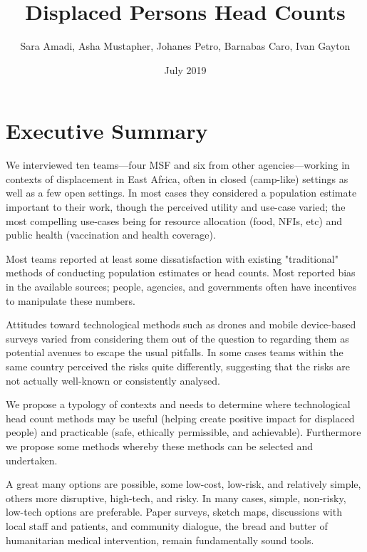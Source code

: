 \documentclass[a4paper,12pt,twoside]{article}
\title{Displaced Persons Head Counts}
\author{Sara Amadi, Asha Mustapher, Johanes Petro, Barnabas Caro, Ivan Gayton }
\date{July 2019}
\begin{document}
\maketitle


\renewcommand{\baselinestretch}{1.5}\normalsize %
\tableofcontents
\renewcommand{\baselinestretch}{1.0}\normalsize

\newpage

\section{Executive Summary}
\begin{multicols}{2}
We interviewed ten teams---four MSF and six from other agencies---working in contexts of displacement in East Africa, often in closed (camp-like) settings as well as a few open settings. In most cases they considered a population estimate important to their work, though the perceived utility and use-case varied; the most compelling use-cases being for resource allocation (food, NFIs, etc) and public health (vaccination and health coverage). 

Most teams reported at least some dissatisfaction with existing "traditional" methods of conducting population estimates or head counts. Most reported bias in the available sources; people, agencies, and governments often have incentives to manipulate these numbers. 

Attitudes toward technological methods such as drones and mobile device-based surveys varied from considering them out of the question to regarding them as potential avenues to escape the usual pitfalls. In some cases teams within the same country perceived the risks quite differently, suggesting that the risks are not actually well-known or consistently analysed. 

We propose a typology of contexts and needs to determine where technological head count methods may be useful (helping create positive impact for displaced people) and practicable (safe, ethically permissible, and achievable). Furthermore we propose some methods whereby these methods can be selected and undertaken.

A great many options are possible, some low-cost, low-risk, and relatively simple, others more disruptive, high-tech, and risky. In many cases, simple, non-risky, low-tech options are preferable. Paper surveys, sketch maps, discussions with local staff and patients, and community dialogue, the bread and butter of humanitarian medical intervention, remain fundamentally sound tools.


\end{multicols}
\end{document}
